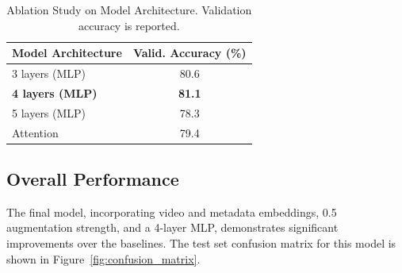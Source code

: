 \begin{table}[hbt!]
\centering
\caption{Ablation Study on Model Architecture. Validation accuracy is reported.}
\label{tab:arch_ablation}
\small
\begin{tabular}{lc}
\toprule
Model Architecture & Valid. Accuracy (\%) \\
\midrule
3 layers (MLP)  & 80.6  \\
\textbf{4 layers (MLP)} & \textbf{81.1} \\
5 layers (MLP) & 78.3 \\
Attention & 79.4 \\
\bottomrule
\end{tabular}
\end{table}

\subsection{Overall Performance}


The final model, incorporating video and metadata embeddings, 0.5 augmentation strength, and a 4-layer MLP, demonstrates significant improvements over the baselines.
The test set confusion matrix for this model is shown in Figure~\ref{fig:confusion_matrix}.


